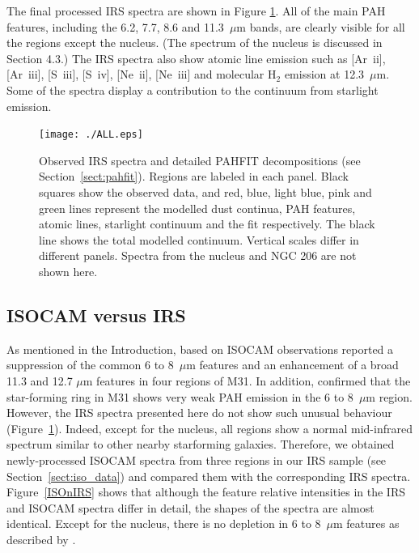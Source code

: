 The final processed IRS spectra are shown in  Figure \ref{PAHFITplots}. All of the main PAH features, including the 6.2, 7.7, 8.6 and 11.3~$\mu$m bands, 
are clearly visible for all the regions except the nucleus. (The spectrum of the nucleus is discussed in Section 4.3.)
The IRS spectra also show atomic line emission such as [Ar~{\sc ii}], [Ar~{\sc iii}], [S~{\sc iii}], [S~{\sc iv}], [Ne~{\sc ii}], [Ne~{\sc iii}] 
and molecular H$_{2}$ emission at 12.3~$\mu$m. Some of the spectra display a contribution to the continuum from starlight emission.


\begin{figure}
\centering
\texttt{[image: ./ALL.eps]}
 \caption{Observed IRS spectra and detailed PAHFIT decompositions (see Section~\ref{sect:pahfit}). Regions are labeled in each panel.
Black squares show the observed data, and red, blue, light blue, pink and green lines represent the modelled
dust continua, PAH features, atomic lines, starlight continuum and the fit respectively. The black line shows the total modelled continuum. 
Vertical scales differ in different panels. Spectra from the nucleus and NGC 206 are not shown here.
}
\label{PAHFITplots}
\end{figure}


\subsection{ISOCAM versus IRS}
\label{sect:iso_vs_irs}

As mentioned in the Introduction, based on ISOCAM observations \citet{1998Cesarsky} reported a suppression of the common 
6 to 8~$\mu$m features and an enhancement of a broad 11.3 and 12.7 $\mu$m features in four regions of M31. 
In addition, \citet{Pagani_1999} confirmed that the star-forming ring in M31 shows very weak PAH emission in the 6 to 8~$\mu$m region. 
However, the IRS spectra presented here do not show such unusual behaviour (Figure~\ref{PAHFITplots}). 
Indeed, except for the nucleus, all regions show a normal mid-infrared spectrum similar to other nearby starforming galaxies. 
Therefore, we obtained newly-processed ISOCAM spectra from three regions in our IRS sample (see Section~\ref{sect:iso_data}) 
and compared them with the corresponding IRS spectra.
Figure~\ref{ISOnIRS} shows that although the feature relative intensities  in the IRS and ISOCAM 
spectra differ in detail, the shapes of the spectra are almost identical. Except for the nucleus, there is no depletion in 
6 to 8~$\mu$m features as described by \citet{1998Cesarsky}. 



